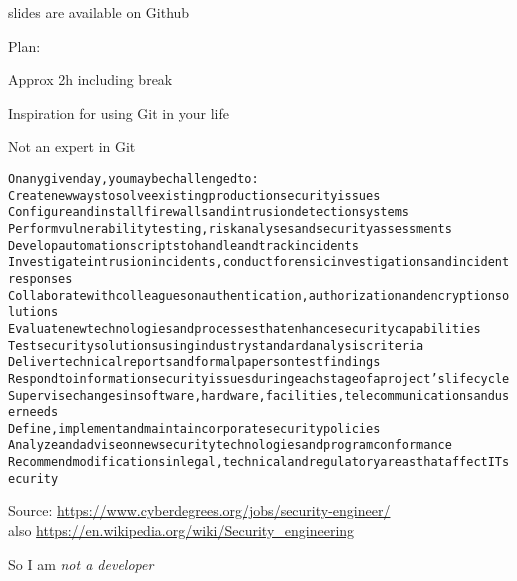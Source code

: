 \documentclass[Screen16to9,17pt]{foils}
\begin{document}


\vskip 1cm
\centerline{\footnotesize slides are available on Github}





\begin{list2}
\item Plan:
\item Approx 2h including break
\item Inspiration for using Git in your life
\item Not an expert in Git
\end{list2}



\begin{alltt}\footnotesize
On any given day, you may be challenged to:
        Create new ways to solve existing production security issues
        Configure and install firewalls and intrusion detection systems
        Perform vulnerability testing, risk analyses and security assessments
        Develop automation scripts to handle and track incidents
        Investigate intrusion incidents, conduct forensic investigations and incident responses
        Collaborate with colleagues on authentication, authorization and encryption solutions
        Evaluate new technologies and processes that enhance security capabilities
        Test security solutions using industry standard analysis criteria
        Deliver technical reports and formal papers on test findings
        Respond to information security issues during each stage of a project’s lifecycle
        Supervise changes in software, hardware, facilities, telecommunications and user needs
        Define, implement and maintain corporate security policies
        Analyze and advise on new security technologies and program conformance
        Recommend modifications in legal, technical and regulatory areas that affect IT security
\end{alltt}

Source: \url{https://www.cyberdegrees.org/jobs/security-engineer/}\\
also
\url{https://en.wikipedia.org/wiki/Security_engineering}

So I am \emph{not a developer}



\end{document}
